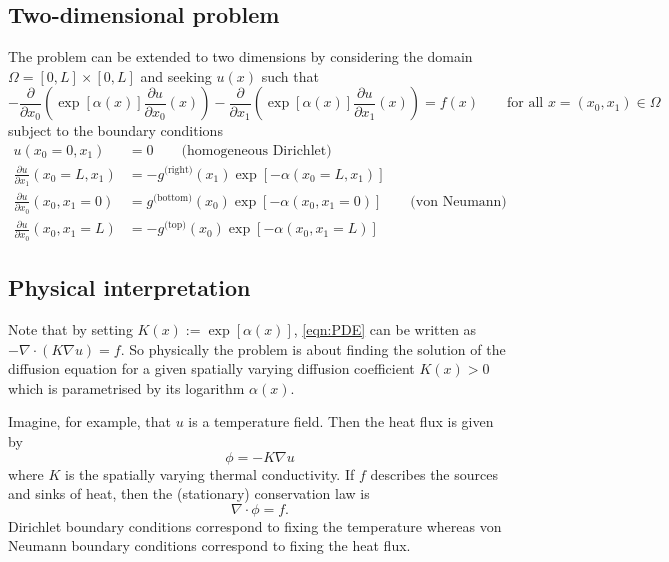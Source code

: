 \documentclass[11pt]{article}
\begin{document}
\subsection{Two-dimensional problem}
The problem can be extended to two dimensions by considering the domain $\Omega=[0,L]\times[0,L]$ and seeking $u(x)$ such that
\begin{equation}
    -\frac{\partial}{\partial x_0}\left(\exp[\alpha(x)]\frac{\partial u}{\partial x_0}(x)\right)-\frac{\partial}{\partial x_1}\left(\exp[\alpha(x)]\frac{\partial u}{\partial x_1}(x)\right) = f(x)\qquad\text{for all $x=(x_0,x_1)\in \Omega$}
    \label{eqn:PDE_2d}
\end{equation}
subject to the boundary conditions 
\begin{equation}
    \begin{aligned}
    u(x_0=0,x_1) &=0 \qquad{\text{(homogeneous Dirichlet)}}\\
    \frac{\partial u}{\partial x_1}(x_0=L,x_1) &=-g^{\text{(right)}}(x_1)\exp[-\alpha(x_0=L,x_1)]\\
    \frac{\partial u}{\partial x_0}(x_0,x_1=0) &=g^{\text{(bottom)}}(x_0)\exp[-\alpha(x_0,x_1=0)] \qquad{\text{(von Neumann)}}\\
    \frac{\partial u}{\partial x_0}(x_0,x_1=L) &=-g^{\text{(top)}}(x_0)\exp[-\alpha(x_0,x_1=L)]
    \end{aligned}
    \label{eqn:boundary_condition_2d}
\end{equation}
\subsection{Physical interpretation}
Note that by setting $K(x):=\exp[\alpha(x)]$, \eqref{eqn:PDE} can be written as $-\nabla\cdot (K\nabla u)=f$. So physically the problem is about finding the solution of the diffusion equation for a given spatially varying diffusion coefficient $K(x)>0$ which is parametrised by its logarithm $\alpha(x)$.

Imagine, for example, that $u$ is a temperature field. Then the heat flux is given by
\begin{equation}
    \phi = - K\nabla u
\end{equation}
where $K$ is the spatially varying thermal conductivity. If $f$ describes the sources and sinks of heat, then the (stationary) conservation law is
\begin{equation}
    \nabla \cdot \phi = f.
\end{equation}
Dirichlet boundary conditions correspond to fixing the temperature whereas von Neumann boundary conditions correspond to fixing the heat flux.
\end{document}
